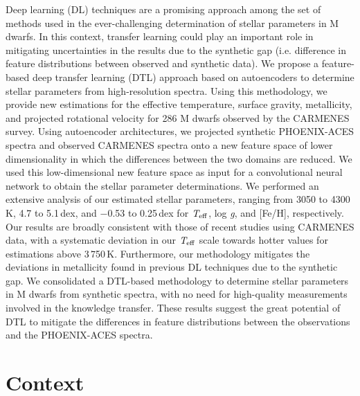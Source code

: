 Deep learning (DL) techniques are a promising approach among the set of methods used in the ever-challenging determination of stellar parameters in M dwarfs. In this context, transfer learning could play an important role in mitigating uncertainties in the results due to the synthetic gap (i.e. difference in feature distributions between observed and synthetic data). We propose a feature-based deep transfer learning (DTL) approach based on autoencoders to determine stellar parameters from high-resolution spectra. Using this methodology, we provide new estimations for the effective temperature, surface gravity, metallicity, and projected rotational velocity for 286 M dwarfs observed by the CARMENES survey. Using autoencoder architectures, we projected synthetic PHOENIX-ACES spectra and observed CARMENES spectra onto a new feature space of lower dimensionality in which the differences between the two domains are reduced. We used this low-dimensional new feature space as input for a convolutional neural network to obtain the stellar parameter determinations. We performed an extensive analysis of our estimated stellar parameters, ranging from 3050 to 4300\,K, 4.7 to 5.1\,dex, and $-$0.53 to 0.25\,dex for $\textit{T}_{\rm eff}$, log \textit{g}, and [Fe/H], respectively. Our results are broadly consistent with those of recent studies using CARMENES data, with a systematic deviation in our $\textit{T}_{\rm eff}$ scale towards hotter values for estimations above 3\,750\,K. Furthermore, our methodology mitigates the deviations in metallicity found in previous DL techniques due to the synthetic gap. We consolidated a DTL-based methodology to determine stellar parameters in M dwarfs from synthetic spectra, with no need for high-quality measurements involved in the knowledge transfer. These results suggest the great potential of DTL to mitigate the differences in feature distributions between the observations and the PHOENIX-ACES spectra.




\section{Context}

